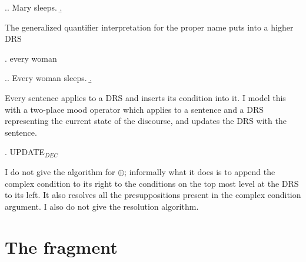 \documentclass[11pt,a4paper]{article}
\begin{document}
\ex.\a. Mary sleeps.
\b. \sysm{[x: x = m']\langle \forall \rangle [: sleeps'm']} 


The generalized quantifier interpretation for the proper name  puts into a higher DRS

\ex. every woman  

\ex.\a. Every woman sleeps.
\b. \sysm{[x: woman'x]\langle\forall\rangle [: sleeps'x]}

Every sentence applies to a DRS and inserts its condition into it. I model this with a two-place mood operator which applies to a sentence  and a DRS representing the current state of the discourse, and updates the DRS with the sentence. 

\ex. UPDATE$_{DEC}$  

I do not give the algorithm for $\oplus$; informally what it does is to append the complex condition to its right to the conditions on the top most level at the DRS to its left. It also resolves all the presuppositions present in the complex condition argument. I also do not give the resolution algorithm.



\section{The fragment}

\setlength{\bibsep}{0pt}
\renewcommand{\bibfont}{\small}


\end{document}
